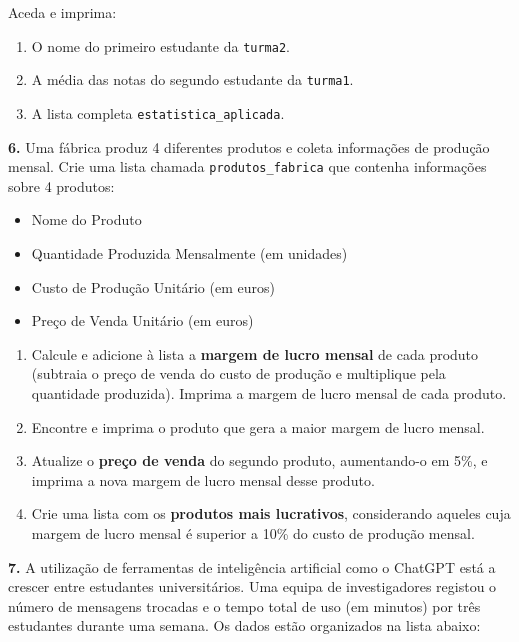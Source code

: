 \documentclass[
]{book}
\providecommand{\tightlist}{%
  \setlength{\itemsep}{0pt}\setlength{\parskip}{0pt}}
\begin{document}
Aceda e imprima:

\begin{enumerate}
\def\labelenumi{(\alph{enumi})}
\tightlist
\item
  O nome do primeiro estudante da \texttt{turma2}.
\item
  A média das notas do segundo estudante da \texttt{turma1}.
\item
  A lista completa \texttt{estatistica\_aplicada}.
\end{enumerate}

\textbf{6.} Uma fábrica produz 4 diferentes produtos e coleta informações de produção mensal. Crie uma lista chamada \texttt{produtos\_fabrica} que contenha informações sobre 4 produtos:

\begin{itemize}
\item
  Nome do Produto
\item
  Quantidade Produzida Mensalmente (em unidades)
\item
  Custo de Produção Unitário (em euros)
\item
  Preço de Venda Unitário (em euros)
\end{itemize}

\begin{enumerate}
\def\labelenumi{(\alph{enumi})}
\item
  Calcule e adicione à lista a \textbf{margem de lucro mensal} de cada produto (subtraia o preço de venda do custo de produção e multiplique pela quantidade produzida). Imprima a margem de lucro mensal de cada produto.
\item
  Encontre e imprima o produto que gera a maior margem de lucro mensal.
\item
  Atualize o \textbf{preço de venda} do segundo produto, aumentando-o em 5\%, e imprima a nova margem de lucro mensal desse produto.
\item
  Crie uma lista com os \textbf{produtos mais lucrativos}, considerando aqueles cuja margem de lucro mensal é superior a 10\% do custo de produção mensal.
\end{enumerate}

\textbf{7.} A utilização de ferramentas de inteligência artificial como o ChatGPT está a crescer entre estudantes universitários. Uma equipa de investigadores registou o número de mensagens trocadas e o tempo total de uso (em minutos) por três estudantes durante uma semana. Os dados estão organizados na lista abaixo:
\end{document}
